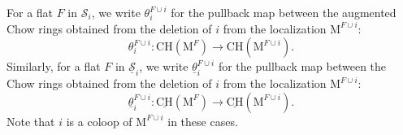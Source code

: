 \documentclass[11pt,reqno]{amsart}
\theoremstyle{definition}
\theoremstyle{remark}
\renewcommand{\(}{\left(}
\renewcommand{\)}{\right)}
\newcommand{\<}{\left<}
\renewcommand{\>}{\right>}
\renewcommand{\and}{\qquad\text{and}\qquad}
\renewcommand{\mid}{\hspace{0.3mm}|\hspace{0.3mm}}
\begin{document}
For a flat $F$ in $\mathscr{S}_i$, %
we write $\theta_i^{F \cup i}$  for the pullback map
between the augmented Chow rings obtained from the deletion of $i$ from the localization $\mathrm{M}^{F \cup i}$:
\[
\theta_i^{F \cup i}: \mathrm{CH}(\mathrm{M}^F)\to \mathrm{CH}(\mathrm{M}^{F\cup i}).  
\]
Similarly, for a flat $F$ in $\underline{\mathscr{S}}_i$, 
we write $\underline{\theta}^{F\cup i}_i$ for the pullback map between the Chow rings obtained from the deletion of $i$ from the localization $\mathrm{M}^{F \cup i}$:
\[
\underline{\theta}_i^{F \cup i}: \underline{\mathrm{CH}}(\mathrm{M}^F)\to \underline{\mathrm{CH}}(\mathrm{M}^{F\cup i}).
\]
Note that $i$ is  a coloop of $\mathrm{M}^{F \cup i}$ in these cases.
\end{document}
